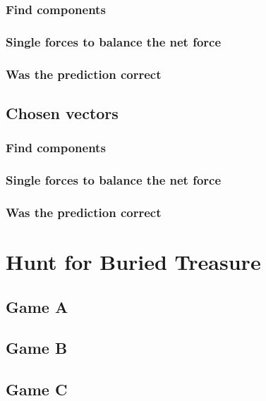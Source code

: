 \documentclass[11pt, letterpaper, includehead]{article}
\begin{document}
\subsubsection{Find components} %

\subsubsection{Single forces to balance the net force} %

\subsubsection{Was the prediction correct} %

\subsection{Chosen vectors} %

\subsubsection{Find components} %

\subsubsection{Single forces to balance the net force} %

\subsubsection{Was the prediction correct} %

\section{Hunt for Buried Treasure} %
\subsection{Game A} %
\subsection{Game B} %
\subsection{Game C} %
\end{document}
